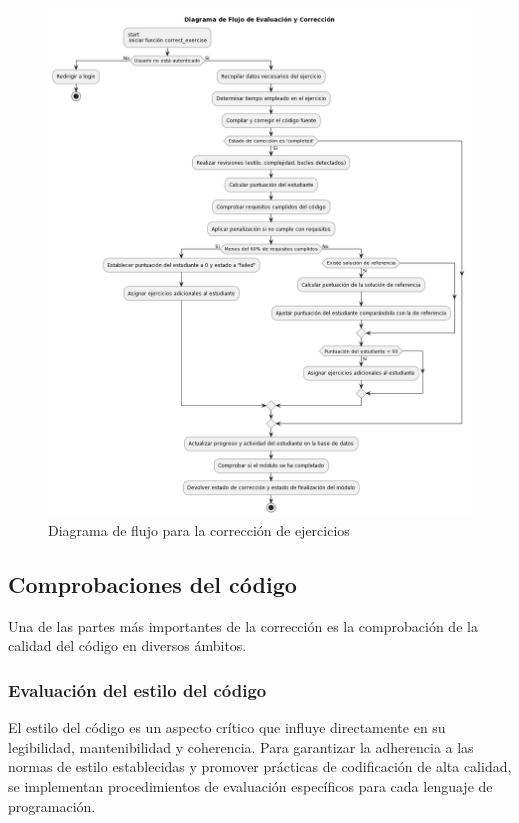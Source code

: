 \begin{figure}[H]
    \centering
    \includegraphics[width=\textwidth]{imagenes/correcionejercicios.png}
    \caption{Diagrama de flujo para la corrección de ejercicios}
    \label{fig:correccion}
\end{figure}

\subsection{Comprobaciones del código}

Una de las partes más importantes de la corrección es la comprobación de la calidad del código en diversos ámbitos. 

\subsubsection*{Evaluación del estilo del código}

El estilo del código es un aspecto crítico que influye directamente en su legibilidad, mantenibilidad y coherencia. Para garantizar la adherencia a las normas de estilo establecidas y promover prácticas de codificación de alta calidad, se implementan procedimientos de evaluación específicos para cada lenguaje de programación.

